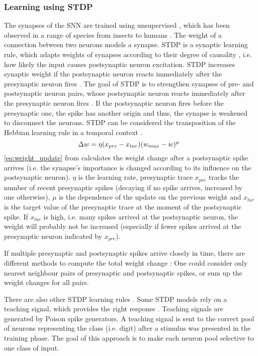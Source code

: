 \subsubsection{Learning using \ac{STDP}}
The synapses of the \ac{SNN} are trained using unsupervised , which has been observed in a range of species from insects to humans \cite{STDP_hebbian}. 
The weight of a connection between two neurons models a synapse.
\ac{STDP} is a synaptic learning rule, which adapts weights of synapses according to their degree of causality \cite{STDP_like,multi_scale_STDP},
 i.e. how likely the input causes postsynaptic neuron excitation.
\ac{STDP} increases synaptic weight if the postsynaptic neuron reacts immediately after the presynaptic neuron fires \cite{object_detection_SNN}.
The goal of \ac{STDP} is to strengthen synapses of pre- and postsynaptic neuron pairs, 
whose postsynaptic neuron reacts immediately after the presynaptic neuron fires \cite{object_detection_SNN}.
If the postsynaptic neuron fires before the presynaptic one, the spike has another origin and thus, the synapse is weakened to disconnect the neurons.
\ac{STDP} can be considered the transposition of the Hebbian learning rule in a temporal context \cite{STDP_vis_feat}.
%
\begin{equation}
    \centering
    \label{eq:weight_update}
    \Delta w = \eta (x_{pre} - x_{tar})(w_{max}-w)^\mu
\end{equation}
%
\autoref{eq:weight_update} from \cite{SNN} calculates the weight change after a postsynaptic spike arrives 
(i.e. the synapse's importance is changed according to its influence on the postsynaptic neuron).
$\eta$ is the learning rate, presynaptic trace $x_{pre}$ tracks the number of recent presynaptic spikes 
(decaying if no spike arrives, increased by one otherwise), 
$\mu$ is the dependence of the update on the previous weight and 
$x_{tar}$ is the target value of the presynaptic trace at the moment of the postsynaptic spike.
If $x_{tar}$ is high, i.e. many spikes arrived at the postsynaptic neuron, the weight will probably not be increased 
(especially if fewer spikes arrived at the presynaptic neuron indicated by  $x_{pre}$).

If multiple presynaptic and postsynaptic spikes arrive closely in time, there are different methods to compute the total weight change \cite{simulation_STDP}:
One could consider only nearest neighbour pairs of presynaptic and postsynaptic spikes, or sum up the weight changes for all pairs.

There are also other \ac{STDP} learning rules \cite{SNN,STDP_random}.
Some \ac{STDP} models rely on a teaching signal, which provides the right response \cite{STDP_like}.
Teaching signals are generated by Poison spike generators.
A teaching signal is sent to the correct pool of neurons representing the class (i.e. digit) after a stimulus was presented in the training phase.
The goal of this approach is to make each neuron pool selective to one class of input.

